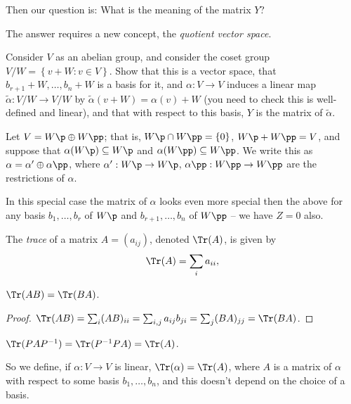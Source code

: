 Then our question is: What is the meaning of the matrix $Y$?

The answer requires a new concept, the \emph{quotient vector space}.

\begin{exercise}
	Consider $V$ as an abelian group, and consider the coset group $V/W=\left\{v+W:v\in V\right\}$. Show that this is a vector space, that $b_{r+1}+W,\ldots,b_n+W$ is a basis for it, and $\alpha:V\to V$ induces a linear map $\widetilde{\alpha}:V/W \to V/W$ by $\widetilde{\alpha}(v+W) = \alpha(v)+W$ (you need to check this is well-defined and linear), and that with respect to this basis, $Y$ is the matrix of $\widetilde{\alpha}$.
\end{exercise}

\begin{remark}
	Let $V=W\p\oplus W\pp$; that is, $W\p\cap W\pp = \{0\}$, $W\p+W\pp=V$, and suppose that  $\alpha(W\p) \subseteq W\p$ and $\alpha(W\pp)\subseteq W\pp$. We write this as $\alpha=\alpha'\oplus\alpha\pp$, where $\alpha':W\p\to W\p$, $\alpha\pp:W\pp\to W\pp$ are the restrictions of $\alpha$. 

	In this special case the matrix of $\alpha$ looks even more special then the above for any basis $b_1,\ldots,b_r$ of $W\p$ and $b_{r+1},\ldots,b_n$ of $W\pp$ -- we have $Z=0$ also.
\end{remark}

\begin{definition}
	The \emph{trace} of a matrix $A=(a_{ij})$, denoted $\Tr(A)$, is given by
	\begin{equation*}
		\Tr(A)=\sum_i a_{ii},
	\end{equation*}
\end{definition}

\begin{lemma}
	$\Tr(AB)=\Tr(BA)$.
\end{lemma}

\begin{proof}
	$\Tr(AB) = \sum_i (AB)_{ii} = \sum_{i,j} a_{ij} b_{ji} = \sum_j (BA)_{jj} = \Tr(BA)$.
\end{proof}
\begin{corollary}
	$\Tr(PAP^{-1}) = \Tr(P^{-1} PA) = \Tr(A)$.
\end{corollary}
\vspace{-6pt}
So we define, if $\alpha:V\to V$ is linear, $\Tr(\alpha)=\Tr(A)$, where $A$ is a matrix of $\alpha$ with respect to some basis $b_1,\ldots,b_n$, and  this doesn't depend on the choice of a basis.

